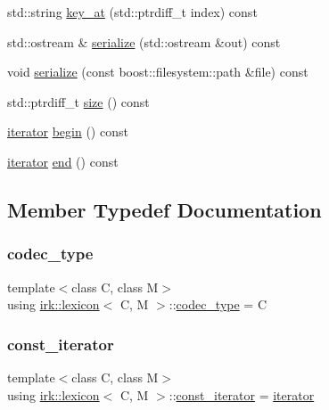 \begin{DoxyCompactItemize}
$$\item 
std\+::string \mbox{\hyperlink{classirk_1_1lexicon_ab93c840be695d2794d2d39ac223103cd}{key\+\_\+at}} (std\+::ptrdiff\+\_\+t index) const
\item 
std\+::ostream \& \mbox{\hyperlink{classirk_1_1lexicon_a85936c0718eedac4ed31b763c46b03de}{serialize}} (std\+::ostream \&out) const
\item 
void \mbox{\hyperlink{classirk_1_1lexicon_ab326b474e74e3253c985b55e8986437e}{serialize}} (const boost\+::filesystem\+::path \&file) const
\item 
std\+::ptrdiff\+\_\+t \mbox{\hyperlink{classirk_1_1lexicon_a2503eaf2cdd72cb08aa7121edc875a3f}{size}} () const
\item 
\mbox{\hyperlink{classirk_1_1lexicon_1_1iterator}{iterator}} \mbox{\hyperlink{classirk_1_1lexicon_a2704e317aeae4af801e47bc888329b06}{begin}} () const
\item 
\mbox{\hyperlink{classirk_1_1lexicon_1_1iterator}{iterator}} \mbox{\hyperlink{classirk_1_1lexicon_a6dd97dfda5dbcafa53626596e8666529}{end}} () const
\end{DoxyCompactItemize}


\subsection{Member Typedef Documentation}
\mbox{\label{classirk_1_1lexicon_a3ec38dbe131c7b0a9551d05ad619fc89}} 
\subsubsection{\texorpdfstring{codec\+\_\+type}{codec\_type}}
{\footnotesize\ttfamily template$<$class C, class M$>$ \\
using \mbox{\hyperlink{classirk_1_1lexicon}{irk\+::lexicon}}$<$ C, M $>$\+::\mbox{\hyperlink{classirk_1_1lexicon_a3ec38dbe131c7b0a9551d05ad619fc89}{codec\+\_\+type}} =  C}

\mbox{\label{classirk_1_1lexicon_a48b20b5f5a8375a0ba0e34526a6684ac}} 
\subsubsection{\texorpdfstring{const\+\_\+iterator}{const\_iterator}}
{\footnotesize\ttfamily template$<$class C, class M$>$ \\
using \mbox{\hyperlink{classirk_1_1lexicon}{irk\+::lexicon}}$<$ C, M $>$\+::\mbox{\hyperlink{classirk_1_1lexicon_a48b20b5f5a8375a0ba0e34526a6684ac}{const\+\_\+iterator}} =  \mbox{\hyperlink{classirk_1_1lexicon_1_1iterator}{iterator}}}

